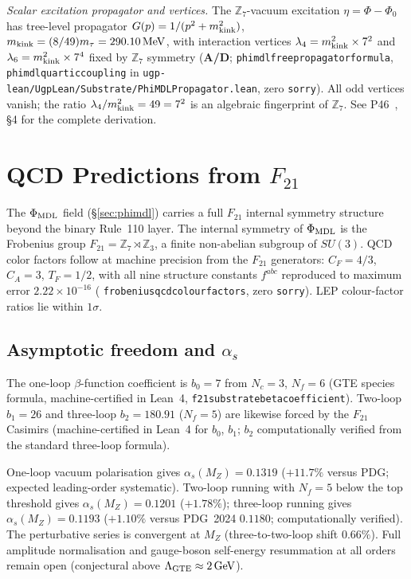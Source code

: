 \documentclass[11pt]{article}
\theoremstyle{remark}
\newcommand{\ZS}{\mathbb{Z}_7}
\newcommand{\Zthree}{\mathbb{Z}_3}
\newcommand{\lean}[1]{%
  \penalty-100
  \begingroup\def\_{\textunderscore\allowbreak}\texttt{#1}\endgroup}
\newcommand{\phimdl}{\Phi_{\rm MDL}}
\newcommand{\Ftwentyone}{F_{21}}
\newcommand{\CatAD}{\textbf{A/D}}
\begin{document}
\noindent\textit{Scalar excitation propagator and vertices.}\enspace
The $\mathbb{Z}_7$-vacuum excitation $\eta = \Phi - \Phi_0$ has tree-level propagator
$G(p) = 1/(p^2 + m_{\rm kink}^2)$, $m_{\rm kink} = (8/49)m_\tau = 290.10\,\text{MeV}$,
with interaction vertices $\lambda_4 = m_{\rm kink}^2 \times 7^2$ and
$\lambda_6 = m_{\rm kink}^2 \times 7^4$ fixed by $\mathbb{Z}_7$ symmetry (\CatAD;
\lean{phimdl\_free\_propagator\_formula}, \lean{phimdl\_quartic\_coupling} in
\texttt{ugp-lean/UgpLean/Substrate/PhiMDLPropagator.lean}, zero \texttt{sorry}).
All odd vertices vanish; the ratio $\lambda_4/m_{\rm kink}^2 = 49 = 7^2$ is an
algebraic fingerprint of $\mathbb{Z}_7$.
See P46~\cite{SpivackGTEPolynomialUFT}, \S4 for the complete derivation.

\section{QCD Predictions from \texorpdfstring{$F_{21}$}{F21}}
\label{sec:qcd}

The $\phimdl$ field (\S\ref{sec:phimdl}) carries a full $\Ftwentyone$ internal symmetry
structure beyond the binary Rule~110 layer.
The internal symmetry of $\phimdl$ is the Frobenius group
$\Ftwentyone = \ZS \rtimes \Zthree$, a finite non-abelian subgroup of $SU(3)$.
QCD color factors follow at machine precision from the $\Ftwentyone$ generators:
$C_F = 4/3$, $C_A = 3$, $T_F = 1/2$, with all nine structure constants $f^{abc}$
reproduced to maximum error $2.22 \times 10^{-16}$
(\lean{frobenius\_qcd\_colour\_factors}, zero \texttt{sorry}).
LEP colour-factor ratios lie within $1\sigma$.

\subsection{Asymptotic freedom and \texorpdfstring{$\alpha_s$}{alpha_s}}

The one-loop $\beta$-function coefficient is
$b_0 = 7$ from $N_c = 3$, $N_f = 6$ (GTE species formula, machine-certified in Lean~4,
\lean{f21\_substrate\_beta\_coefficient}).
Two-loop $b_1 = 26$ and three-loop $b_2 = 180.91$ ($N_f = 5$) are likewise
forced by the $\Ftwentyone$ Casimirs (machine-certified in Lean~4 for $b_0$, $b_1$;
$b_2$ computationally verified from the standard three-loop formula).

One-loop vacuum polarisation gives $\alpha_s(M_Z) = 0.1319$ ($+11.7\%$ versus PDG;
expected leading-order systematic).
Two-loop running with $N_f = 5$ below the top threshold gives
$\alpha_s(M_Z) = 0.1201$ ($+1.78\%$); three-loop running gives
$\alpha_s(M_Z) = 0.1193$ ($+1.10\%$ versus PDG~2024 $0.1180$; computationally verified).
The perturbative series is convergent at $M_Z$ (three-to-two-loop shift $0.66\%$).
Full amplitude normalisation and gauge-boson self-energy resummation at all orders
remain open (conjectural above $\Lambda_{\rm GTE} \approx 2\,\text{GeV}$).
\end{document}
